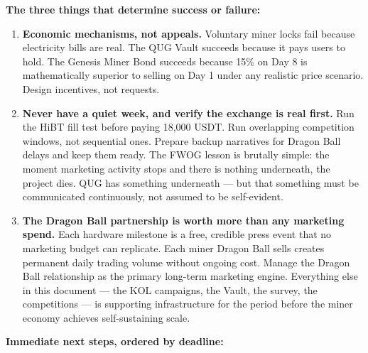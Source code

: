 \documentclass[11pt,a4paper]{article}
\begin{document}
\begin{tcolorbox}[greenbox]
\textbf{The three things that determine success or failure:}

\begin{enumerate}[leftmargin=1em, itemsep=4pt]
  \item \textbf{Economic mechanisms, not appeals.} Voluntary miner locks fail because electricity bills are real. The QUG Vault succeeds because it pays users to hold. The Genesis Miner Bond succeeds because 15\% on Day 8 is mathematically superior to selling on Day 1 under any realistic price scenario. Design incentives, not requests.

  \item \textbf{Never have a quiet week, and verify the exchange is real first.} Run the HiBT fill test before paying 18,000 USDT. Run overlapping competition windows, not sequential ones. Prepare backup narratives for Dragon Ball delays and keep them ready. The FWOG lesson is brutally simple: the moment marketing activity stops and there is nothing underneath, the project dies. QUG has something underneath — but that something must be communicated continuously, not assumed to be self-evident.

  \item \textbf{The Dragon Ball partnership is worth more than any marketing spend.} Each hardware milestone is a free, credible press event that no marketing budget can replicate. Each miner Dragon Ball sells creates permanent daily trading volume without ongoing cost. Manage the Dragon Ball relationship as the primary long-term marketing engine. Everything else in this document — the KOL campaigns, the Vault, the survey, the competitions — is supporting infrastructure for the period before the miner economy achieves self-sustaining scale.
\end{enumerate}
\end{tcolorbox}

\medskip

\textbf{Immediate next steps, ordered by deadline:}
\end{document}

